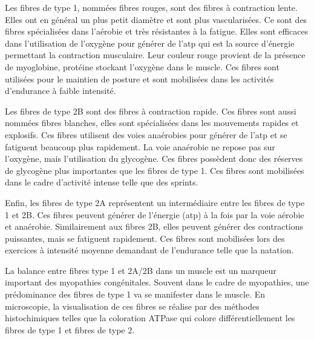 Les fibres de type 1, nommées fibres rouges, sont des fibres à contraction lente. Elles ont en général un plus petit diamètre et sont plus vascularisées. Ce sont des fibres spécialisées dans l'aérobie et très résistantes à la fatigue. Elles sont efficaces dans l'utilisation de l'oxygène pour générer de l'\gls{atp} qui est la source d'énergie permettant la contraction musculaire. Leur couleur rouge provient de la présence de myoglobine, protéine stockant l'oxygène dans le muscle. Ces fibres sont utilisées pour le maintien de posture et sont mobilisées dans les activités d'endurance à faible intensité.


Les fibres de type 2B sont des fibres à contraction rapide. Ces fibres sont aussi nommées fibres blanches, elles sont spécialisées dans les mouvements rapides et explosifs. Ces fibres utilisent des voies anaérobies pour générer de l'\gls{atp} et se fatiguent beaucoup plus rapidement. La voie anaérobie ne repose pas sur l'oxygène, mais l'utilisation du glycogène. Ces fibres possèdent donc des réserves de glycogène plus importantes que les fibres de type 1. Ces fibres sont mobilisées dans le cadre d'activité intense telle que des sprints.


Enfin, les fibres de type 2A représentent un intermédiaire entre les fibres de type 1 et 2B.  Ces fibres peuvent générer de l'énergie (\gls{atp}) à la fois par la voie aérobie et anaérobie. Similairement aux fibres 2B, elles peuvent générer des contractions puissantes, mais se fatiguent rapidement. Ces fibres sont mobilisées lors des exercices à intensité moyenne demandant de l'endurance telle que la natation.


La balance entre fibres type 1 et 2A/2B dans un muscle est un marqueur important des myopathies congénitales. Souvent dans le cadre de myopathies, une prédominance des fibres de type 1 va se manifester dans le muscle. En microscopie, la visualisation de ces fibres se réalise par des méthodes histochimiques telles que la coloration ATPase qui colore différentiellement les fibres de type 1 et fibres de type 2. 


